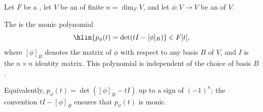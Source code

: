 \begin{definition} \label{definition:characteristic_polynomial_of_an_endomorphism_of_a_vector_space_over_a_field}
Let $F$ be a , let $V$ be an  of finite  $n = \dim_F V$, and let $\phi : V \to V$ be an  of $V$.

The  is the monic polynomial
$$\hlin{p_\phi(t) = \det(tI - [\phi]_B)} \in F[t],$$
where $[\phi]_B$ denotes the matrix of $\phi$ with respect to any basis $B$ of $V$, and $I$ is the $n \times n$ identity matrix. This polynomial is independent of the choice of basis $B$.

Equivalently, $p_\phi(t) = \det([\phi]_B - tI)$ up to a sign of $(-1)^n$; the convention $tI - [\phi]_B$ ensures that $p_\phi(t)$ is monic.
\end{definition}
